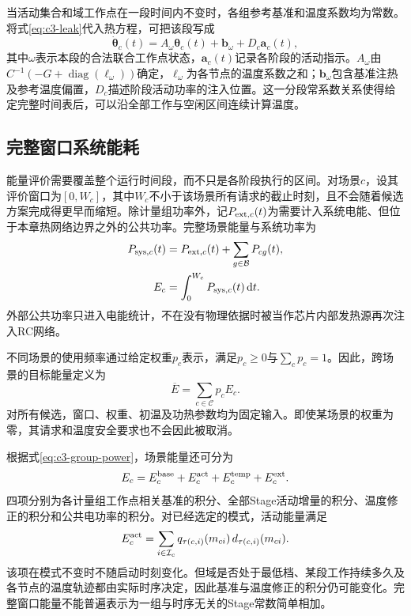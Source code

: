 当活动集合和域工作点在一段时间内不变时，各组参考基准和温度系数均为常数。将式\eqref{eq:c3-leak}代入热方程，可把该段写成
\begin{equation}
 \dot{\boldsymbol\theta}_c(t)=
 A_\omega\boldsymbol\theta_c(t)
 +\boldsymbol b_\omega+D_c\boldsymbol a_c(t),
 \label{eq:c3-affine-ode}
\end{equation}
其中$\omega$表示本段的合法联合工作点状态，$\boldsymbol a_c(t)$记录各阶段的活动指示。$A_\omega$由$C^{-1}(-G+\operatorname{diag}(\boldsymbol\ell_\omega))$确定，$\boldsymbol\ell_\omega$为各节点的温度系数之和；$\boldsymbol b_\omega$包含基准注热及参考温度偏置，$D_c$描述阶段活动功率的注入位置。这一分段常系数关系使得给定完整时间表后，可以沿全部工作与空闲区间连续计算温度。

\subsection{完整窗口系统能耗}

能量评价需要覆盖整个运行时间段，而不只是各阶段执行的区间。对场景$c$，设其评价窗口为$[0,W_c]$，其中$W_c$不小于该场景所有请求的截止时刻，且不会随着候选方案完成得更早而缩短。除计量组功率外，记$P_{{\rm ext},c}(t)$为需要计入系统电能、但位于本章热网络边界之外的公共功率。完整场景能量与系统功率为
\begin{equation}
 \begin{aligned}
 P_{{\rm sys},c}(t)
    &=P_{{\rm ext},c}(t)+\sum_{g\in\mathcal B}P_{cg}(t),\\
 E_c&=\int_0^{W_c}P_{{\rm sys},c}(t)\,\mathrm dt.
 \end{aligned}
 \label{eq:c3-scene-energy}
\end{equation}
外部公共功率只进入电能统计，不在没有物理依据时被当作芯片内部发热源再次注入RC网络。

不同场景的使用频率通过给定权重$p_c$表示，满足$p_c\ge0$与$\sum_cp_c=1$。因此，跨场景的目标能量定义为
\begin{equation}
 \overline E=\sum_{c\in\mathcal C}p_cE_c.
 \label{eq:c3-weighted-energy}
\end{equation}
对所有候选，窗口、权重、初温及功热参数均为固定输入。即使某场景的权重为零，其请求和温度安全要求也不会因此被取消。

根据式\eqref{eq:c3-group-power}，场景能量还可分为
\begin{equation}
 E_c=E_c^{\rm base}+E_c^{\rm act}
     +E_c^{\rm temp}+E_c^{\rm ext}.
 \label{eq:c3-energy-parts}
\end{equation}
四项分别为各计量组工作点相关基准的积分、全部Stage活动增量的积分、温度修正的积分和公共电功率的积分。对已经选定的模式，活动能量满足
\begin{equation}
 E_c^{\rm act}
 =\sum_{i\in\mathcal I_c}
 q_{\tau(c,i)}(m_{ci})\,d_{\tau(c,i)}(m_{ci}).
 \label{eq:c3-act-energy}
\end{equation}
该项在模式不变时不随启动时刻变化。但域是否处于最低档、某段工作持续多久及各节点的温度轨迹都由实际时序决定，因此基准与温度修正的积分仍可能变化。完整窗口能量不能普遍表示为一组与时序无关的Stage常数简单相加。

